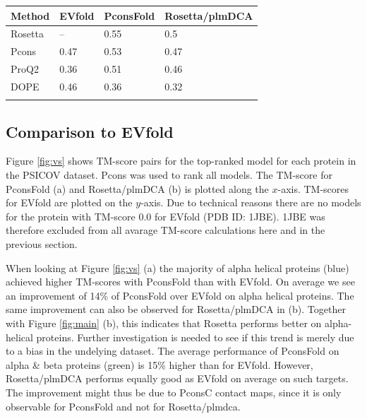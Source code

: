 \documentclass{bioinfo}
\begin{document}
\begin{table}[!t]
{\begin{tabular}{llll}\toprule
Method & EVfold & PconsFold & Rosetta/plmDCA \\ \midrule
Rosetta & -- & 0.55 & 0.5 \\
Pcons & 0.47 & 0.53 & 0.47 \\
ProQ2 & 0.36 & 0.51 & 0.46 \\
DOPE & 0.46 & 0.36 & 0.32 \\ \botrule
\end{tabular}}{}
\end{table}



\subsection{Comparison to EVfold}

Figure \ref{fig:vs} shows TM-score pairs for the top-ranked model for each protein in the PSICOV dataset. Pcons was used to rank all models. The TM-score for PconsFold (a) and Rosetta/plmDCA (b) is plotted along the $x$-axis. TM-scores for EVfold are plotted on the $y$-axis. Due to technical reasons there are no models for the protein with TM-score 0.0 for EVfold  (PDB ID: 1JBE). 1JBE was therefore excluded from all avarage TM-score calculations here and in the previous section.


When looking at Figure \ref{fig:vs} (a) the majority of alpha helical proteins (blue) achieved higher TM-scores with PconsFold than with EVfold. On average we see an improvement of 14\% of PconsFold over EVfold on alpha helical proteins. The same improvement can also be observed for Rosetta/plmDCA in (b). Together with Figure \ref{fig:main} (b), this indicates that Rosetta performs better on alpha-helical proteins. Further investigation is needed to see if this trend is merely due to a bias in the undelying dataset. The average performance of PconsFold on alpha \& beta proteins (green) is 15\% higher than for EVfold. However, Rosetta/plmDCA performs equally good as EVfold on average on such targets. The improvement might thus be due to PconsC contact maps, since it is only observable for PconsFold and not for Rosetta/plmdca.
\end{document}

